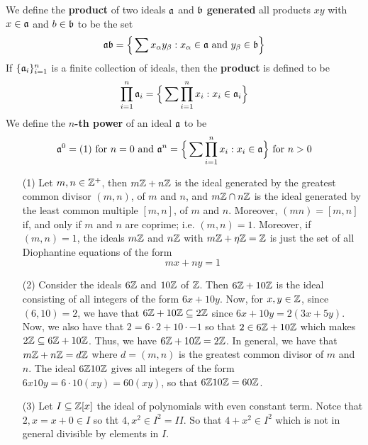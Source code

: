 \begin{definition}
  We define the \textbf{product} of two ideals $\af$ and $\bf$
  \textbf{generated} all products $xy$ with $x \in \af$ and $b \in \bf$ to be
  the set
  \begin{equation*}
    \af\bf=
    \Big{\{} \sum{x_\a y_\b} : x_\a \in \af \text{ and } y_\b \in \bf \Big{\}}
  \end{equation*}
  If $\{\af_i\}_{i=1}^n$ is a finite collection of ideals, then the
  \textbf{product} is defined to be
  \begin{equation*}
    \prod_{i=1}^{n}{\af_i}=
    \Big{\{} \sum{\prod_{i=1}^n{x_i}} : x_i \in \af_i \Big{\}}
  \end{equation*}
  We define the \textbf{$n$-th power} of an ideal $\af$ to be
  \begin{equation*}
    \af^0=(1) \text{ for } n=0 \text{ and }
    \af^n=\Big{\{} \sum{\prod_{i=1}^n{x_i}} : x_i \in \af  \Big{\}}
    \text{ for } n>0
  \end{equation*}
\end{definition}

\begin{example}\label{example_5.17}
  \begin{enumerate}
    \item[(1)] Let $m,n \in \Z^+$, then $m\Z+n\Z$ is the ideal generated by
      the greatest common divisor $(m,n)$, of $m$ and $n$, and $m\Z \cap n\Z$
      is the ideal generated by the least common multiple $[m,n]$, of $m$ and
      $n$. Moreover, $(mn)=[m,n]$ if, and only if $m$ and $n$ are coprime; i.e.
      $(m,n)=1$. Moreover, if $(m,n)=1$, the ideals $m\Z$ and $n\Z$
      with $m\Z+\n\Z=\Z$ is just the set of all Diophantine equations
      of the form
      \begin{equation*}
        mx+ny=1
      \end{equation*}

    \item[(2)] Consider the ideals $6\Z$ and  $10\Z$ of $\Z$. Then $6\Z+10\Z$ is
      the ideal consisting of all integers of the form  $6x+10y$. Now, for
      $x,y \in \Z$, since $(6,10)=2$, we have that $6\Z+10\Z \subseteq 2\Z$
      since  $6x+10y=2(3x+5y)$. Now, we also have that $2=6 \cdot 2+10 \cdot
      -1$ so that  $2 \in 6\Z+10\Z$ which makes $2\Z \subseteq 6\Z+10\Z$.
      Thus, we have $6\Z+10\Z=2\Z$. In general, we have that $m\Z+n\Z=d\Z$
      where $d=(m,n)$ is the greatest common divisor of $m$ and  $n$. The
      ideal $6\Z10\Z$ gives all integers of the form $6x10y=6 \cdot 10
      (xy)=60(xy)$, so that $6\Z10\Z=60\Z$.

    \item[(3)] Let $I \subseteq \Z[x]$ the ideal of polynomials with even
      constant term. Notce that $2,x=x+0 \in I$ so tht  $4,x^2 \in I^2=II$. So
      that  $4+x^2\in I^2$ which is not in general divisible by elements in $I$.
  \end{enumerate}
\end{example}

